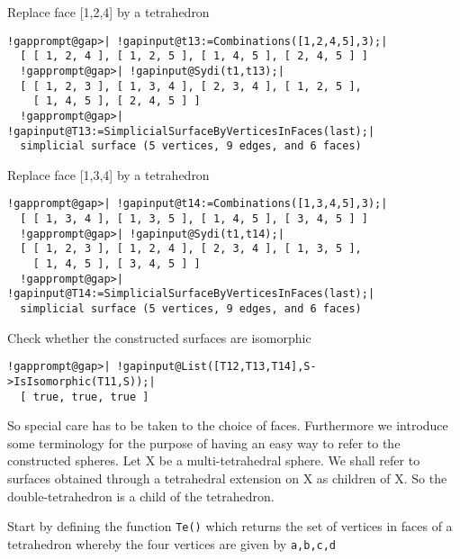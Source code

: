 \documentclass[a4paper,11pt]{report}
\begin{document}
{{{ Replace face [1,2,4] by a tetrahedron 

 
\begin{Verbatim}[commandchars=!@|,fontsize=\small,frame=single,label=Example]
  !gapprompt@gap>| !gapinput@t13:=Combinations([1,2,4,5],3);|
  [ [ 1, 2, 4 ], [ 1, 2, 5 ], [ 1, 4, 5 ], [ 2, 4, 5 ] ]
  !gapprompt@gap>| !gapinput@Sydi(t1,t13);|
  [ [ 1, 2, 3 ], [ 1, 3, 4 ], [ 2, 3, 4 ], [ 1, 2, 5 ],
    [ 1, 4, 5 ], [ 2, 4, 5 ] ]
  !gapprompt@gap>| !gapinput@T13:=SimplicialSurfaceByVerticesInFaces(last);|
  simplicial surface (5 vertices, 9 edges, and 6 faces)
\end{Verbatim}
 

 Replace face [1,3,4] by a tetrahedron 

 
\begin{Verbatim}[commandchars=!@|,fontsize=\small,frame=single,label=Example]
  !gapprompt@gap>| !gapinput@t14:=Combinations([1,3,4,5],3);|
  [ [ 1, 3, 4 ], [ 1, 3, 5 ], [ 1, 4, 5 ], [ 3, 4, 5 ] ]
  !gapprompt@gap>| !gapinput@Sydi(t1,t14);|
  [ [ 1, 2, 3 ], [ 1, 2, 4 ], [ 2, 3, 4 ], [ 1, 3, 5 ],
    [ 1, 4, 5 ], [ 3, 4, 5 ] ]
  !gapprompt@gap>| !gapinput@T14:=SimplicialSurfaceByVerticesInFaces(last);|
  simplicial surface (5 vertices, 9 edges, and 6 faces)
\end{Verbatim}
 

 Check whether the constructed surfaces are isomorphic 

 
\begin{Verbatim}[commandchars=!@|,fontsize=\small,frame=single,label=Example]
  !gapprompt@gap>| !gapinput@List([T12,T13,T14],S->IsIsomorphic(T11,S));|
  [ true, true, true ]
\end{Verbatim}
 

 
\begin{center}

\end{center}
 

 So special care has to be taken to the choice of faces. Furthermore we
introduce some terminology for the purpose of having an easy way to refer to
the constructed spheres. Let X be a multi-tetrahedral sphere. We shall refer
to surfaces obtained through a tetrahedral extension on X as children of X. So
the double-tetrahedron is a child of the tetrahedron. 

 Start by defining the function \texttt{Te()} which returns the set of vertices in faces of a tetrahedron whereby the four
vertices are given by \texttt{a,b,c,d} 

}}}
\end{document}
